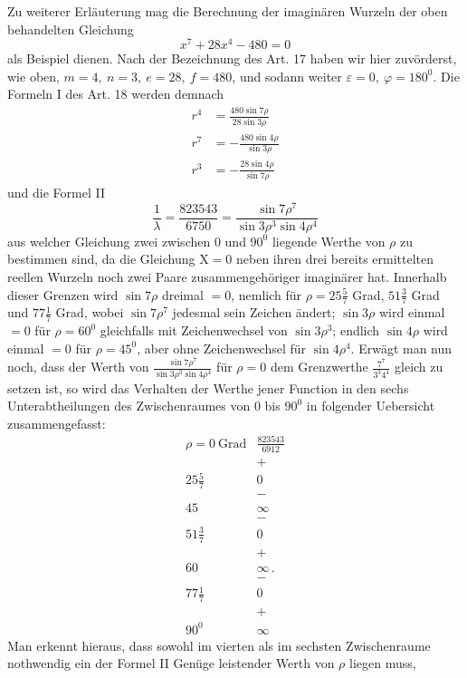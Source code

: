 Zu weiterer Erläuterung mag die Berechnung der imaginären Wurzeln der
oben behandelten Gleichung
\[
x^7+28x^4-480=0
\]
als Beispiel dienen. Nach der Bezeichnung des Art. 17 haben wir hier zuvörderst,
wie oben, $m=4,\ n=3,\ e=28,\ f=480$, und sodann weiter $\varepsilon=0,\ \varphi=180^{0}$.
Die Formeln I des Art. 18 werden demnach
\[
\begin{aligned}
r^4&=\frac{480\sin7\rho}{28\sin3\rho}\\
r^7&=-\frac{480\sin4\rho}{\sin3\rho}\\
r^3&=-\frac{28\sin4\rho}{\sin7\rho}
\end{aligned}
\]
und die Formel II
\[
\frac{1}{\lambda}=\frac{823543}{6750}=\frac{\sin7\rho^7}{\sin3\rho^3\sin4\rho^4}
\]
aus welcher Gleichung zwei zwischen $0$ und $90^{0}$ liegende Werthe von $\rho$ zu bestimmen sind, da die Gleichung $\mathrm{X}=0$ neben ihren drei bereits ermittelten reellen Wurzeln noch zwei Paare zusammengehöriger imaginärer hat. Innerhalb
dieser Grenzen wird $\sin7\rho$ dreimal $=0$, nemlich für $\rho=25\frac57$ Grad, $51\frac37$
Grad und $77\frac17$ Grad, wobei $\sin7\rho^7$ jedesmal sein Zeichen ändert; $\sin3\rho$ wird
einmal $=0$ für $\rho=60^{0}$ gleichfalls mit Zeichenwechsel von $\sin3\rho^3$; endlich
$\sin4\rho$ wird einmal $=0$ für $\rho=45^{0}$, aber ohne Zeichenwechsel für $\sin4\rho^4$.
Erwägt man nun noch, dass der Werth von $\frac{\sin7\rho^7}{\sin3\rho^3\sin4\rho^4}$ für $\rho=0$ dem Grenzwerthe $\frac{7^7}{3^3 4^4}$ gleich zu setzen ist, so wird das Verhalten der Werthe jener Function
in den sechs Unterabtheilungen des Zwischenraumes von $0$ bis $90^{0}$ in folgender
Uebersicht zusammengefasst:
\[
\begin{array}{c|c}
\rho=0\ \text{Grad}&\frac{823543}{6912}\\
&+\\
25\frac57&0\\
&-\\
45&\infty\\
&-\\
51\frac37&0\\
&+\\
60&\infty\,.\\
&-\\
77\frac17&0\\
&+\\
90^{0}&\infty
\end{array}
\]
Man erkennt hieraus, dass sowohl im vierten als im sechsten Zwischenraume nothwendig ein der Formel II Genüge leistender Werth von $\rho$ liegen muss,
